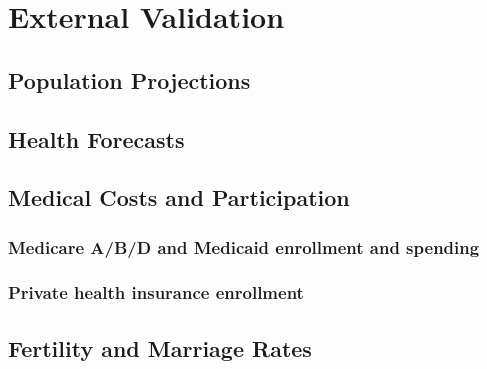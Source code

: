 \section{External Validation}
\subsection{Population Projections}
\subsection{Health Forecasts}
\subsection{Medical Costs and Participation}
\subsubsection{Medicare A/B/D and Medicaid enrollment and spending}
\subsubsection{Private health insurance enrollment}
\subsection{Fertility and Marriage Rates}
